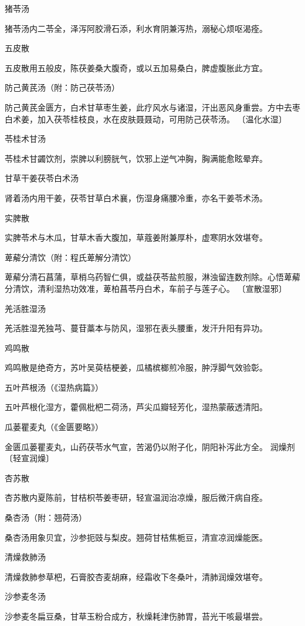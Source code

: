 \documentclass[a4paper,12pt,UTF8,twoside]{ctexbook}
\begin{document}
猪苓汤

猪苓汤内二苓全，泽泻阿胶滑石添，利水育阴兼泻热，溺秘心烦呕渴痊。

五皮散

五皮散用五般皮，陈茯姜桑大腹奇，或以五加易桑白，脾虚腹胀此方宜。

防己黄芪汤（附：防己茯苓汤）

防己黄芪金匮方，白术甘草枣生姜，此疗风水与诸湿，汗出恶风身重尝。方中去枣白术姜，加入茯苓桂枝良，水在皮肤聂聂动，可用防己茯苓汤。
〔温化水湿〕

苓桂术甘汤

苓桂术甘蠲饮剂，崇脾以利膀胱气，饮邪上逆气冲胸，胸满能愈眩晕弃。

甘草干姜茯苓白术汤

肾着汤内用干姜，茯苓甘草白术襄，伤湿身痛腰冷重，亦名干姜苓术汤。

实脾散

实脾苓术与木瓜，甘草木香大腹加，草蔻姜附兼厚朴，虚寒阴水效堪夸。

萆薢分清饮（附：程氏萆解分清饮）

萆薢分清石菖蒲，草梢乌药智仁俱，或益茯苓盐煎服，淋浊留连数剂除。心悟萆薢分清饮，清利湿热功效准，萆柏菖苓丹白术，车前子与莲子心。
〔宣散湿邪〕

羌活胜湿汤

羌活胜湿羌独芎、蔓苷藁本与防风，湿邪在表头腰重，发汗升阳有异功。

鸡鸣散

鸡鸣散是绝奇方，苏叶吴萸桔梗姜，瓜橘槟榔煎冷服，肿浮脚气效验彰。

五叶芦根汤（《湿热病篇》）

五叶芦根化湿方，藿佩枇杷二荷汤，芦尖瓜瓣轻芳化，湿热蒙蔽透清阳。

瓜蒌瞿麦丸（《金匮要略》）

金匮瓜蒌瞿麦丸，山药茯苓水气宣，苦渴仍以附子化，阴阳补泻此方全。
润燥剂
〔轻宣润燥〕

杏苏散

杏苏散内夏陈前，甘桔枳苓姜枣研，轻宣温润治凉燥，服后微汗病自痊。

桑杏汤（附：翘荷汤）

桑杏汤用象贝宜，沙参扼豉与梨皮。翘荷甘桔焦栀豆，清宣凉润燥能医。

清燥救肺汤

清燥救肺参草杷，石膏胶杏麦胡麻，经霜收下冬桑叶，清肺润燥效堪夸。

沙参麦冬汤

沙参麦冬扁豆桑，甘草玉粉合成方，秋燥耗津伤肺胃，苔光干咳最堪尝。
\end{document}

